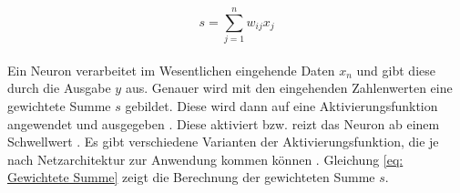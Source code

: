 		\begin{equation}
			s=\sum_{j=1}^n w_{ij}x_j
			\label{eq: Gewichtete Summe}
		\end{equation}
		\\
		
		 Ein Neuron verarbeitet im Wesentlichen eingehende Daten $x_n$ und gibt diese durch die Ausgabe $y$ aus. Genauer wird mit den eingehenden Zahlenwerten eine gewichtete Summe $s$ gebildet. Diese wird dann auf eine Aktivierungsfunktion angewendet und ausgegeben \cite{bildv2020}. Diese aktiviert bzw. reizt das Neuron ab einem Schwellwert \cite{Kriesel}. Es gibt verschiedene Varianten der Aktivierungsfunktion, die je nach Netzarchitektur zur Anwendung kommen können \cite{Kriesel}. Gleichung \ref{eq: Gewichtete Summe} zeigt die Berechnung der gewichteten Summe $s$.\\
		
		
				
